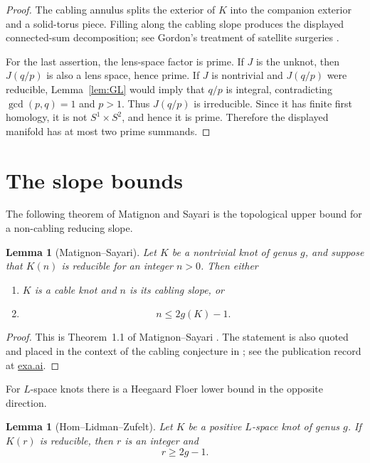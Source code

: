 \documentclass[11pt]{article}
\newtheorem{lemma}[theorem]{Lemma}
\theoremstyle{definition}
\theoremstyle{remark}
\begin{document}
\begin{proof}
The cabling annulus splits the exterior of $K$ into the companion exterior
and a solid-torus piece.  Filling along the cabling slope produces the
displayed connected-sum decomposition; see Gordon's treatment of satellite
surgeries \cite{GordonSatellite}.

For the last assertion, the lens-space factor is prime.  If $J$ is the
unknot, then $J(q/p)$ is also a lens space, hence prime.  If $J$ is
nontrivial and $J(q/p)$ were reducible, Lemma~\ref{lem:GL} would imply that
$q/p$ is integral, contradicting $\gcd(p,q)=1$ and $p>1$.  Thus $J(q/p)$ is
irreducible.  Since it has finite first homology, it is not $S^1\times S^2$,
and hence it is prime.  Therefore the displayed manifold has at most two
prime summands.
\end{proof}

\section{The slope bounds}

The following theorem of Matignon and Sayari is the topological upper bound
for a non-cabling reducing slope.

\begin{lemma}[Matignon--Sayari]
\label{lem:MS}
Let $K$ be a nontrivial knot of genus $g$, and suppose that $K(n)$ is
reducible for an integer $n>0$.  Then either
\begin{enumerate}
\item $K$ is a cable knot and $n$ is its cabling slope, or
\item
\[
n\le 2g(K)-1.
\]
\end{enumerate}
\end{lemma}

\begin{proof}
This is Theorem~1.1 of Matignon--Sayari \cite{MatignonSayari}.  The
statement is also quoted and placed in the context of the cabling
conjecture in \cite{LSGB}; see the publication record at
\href{https://exa.ai/library/publication/zl1m8jt741b}{exa.ai}.
\end{proof}

For $L$-space knots there is a Heegaard Floer lower bound in the opposite
direction.

\begin{lemma}[Hom--Lidman--Zufelt]
\label{lem:HLZ}
Let $K$ be a positive $L$-space knot of genus $g$.  If $K(r)$ is reducible,
then $r$ is an integer and
\[
r\ge 2g-1.
\]
\end{lemma}
\end{document}
